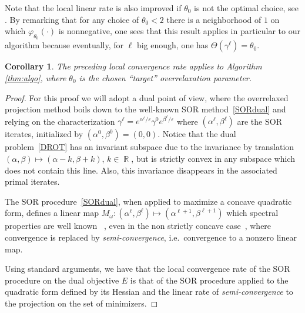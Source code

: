 \documentclass{article} %
\DeclareMathOperator{\IR}{\mathbb{R}}
\renewcommand{\epsilon}{\varepsilon}
\theoremstyle{plain}
\newtheorem{corollary}{Corollary}
\theoremstyle{definition}
\theoremstyle{remark}
\begin{document}
Note that the local linear rate is also improved if $\theta_0$ is not the optimal choice, see \cite[chapter 5]{ciarlet1982introduction}. By remarking that for any choice of $\theta_0<2$ there is a neighborhood of $1$ on which $\varphi_{\theta_0}(\cdot)$ is nonnegative, one sees that this result applies in particular to our algorithm because eventually, for $\ell$ big enough, one has $\Theta(\gamma^\ell)=\theta_0$.
\begin{corollary}
The preceding local convergence rate applies to Algorithm \ref{thm:algo}, where $\theta_0$ is the chosen ``target'' overrelaxation parameter.
\end{corollary}
\begin{proof}
For this proof we will adopt a dual point of view, where the overrelaxed projection method boils down to the well-known SOR method~\eqref{SORdual}  and relying on the characterization $\gamma^{\ell}=e^{\alpha^\ell/\epsilon}\gamma^0e^{\beta^\ell/\epsilon}$ where $(\alpha^\ell,\beta^\ell)$ are the SOR iterates, initialized by $(\alpha^0,\beta^0)=(0,0)$. Notice that the dual problem~\eqref{DROT} has an invariant subspace due to the invariance by translation $(\alpha,\beta)\mapsto (\alpha-k,\beta+k)$, $k\in \IR$, but is strictly convex in any subspace which does not contain this line. Also, this invariance disappears in the associated primal iterates. 

The SOR procedure~\eqref{SORdual}, when applied to maximize a concave quadratic form, defines a linear map $M_\omega : (\alpha^{\ell},\beta^{\ell})\mapsto (\alpha^{\ell+1},\beta^{\ell+1})$ which spectral properties are well known~\cite{ciarlet1982introduction, young2014iterative} , even in the non strictly concave case~\cite{hadjidimos1985optimization}, where convergence is replaced by \emph{semi-convergence}, i.e.\ convergence to a nonzero linear map.

Using standard arguments, we have that the local convergence rate of the SOR procedure on the dual objective $E$ is that of the SOR procedure applied to the quadratic form defined by its Hessian and the linear rate of \emph{semi-convergence} to the projection on the set of minimizers. 
\end{proof}

\end{document}
